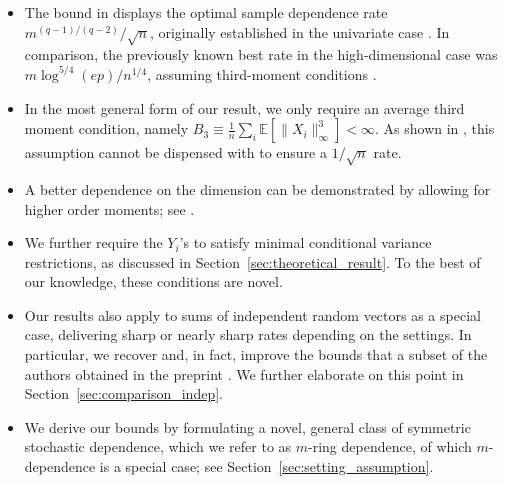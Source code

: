 \documentclass[aos]{imsart}
\begin{document}
\begin{itemize}
    \item The bound in  displays the optimal sample dependence rate $m^{(q-1)/(q-2)}/\sqrt{n}$,
    originally established in the univariate case \citep{shergin1980convergence,chen2004normal}. 
    In comparison, the previously known best rate in the high-dimensional case was $m\log^{5/4}(ep)/n^{1/4}$, assuming third-moment conditions \citep[Theorem 1.4]{fang2021high}.
    \item In the most general form of our result, we only require an average third moment condition, namely $ B _3 \equiv \frac{1}{n} \sum_i \mathbb{E}[\| X_i\|^3_\infty] < \infty$. As shown in , this assumption cannot be dispensed with to ensure a $1/\sqrt{n}$ rate. 
    \item A better dependence on the dimension can be demonstrated by allowing for higher order moments; see .
    \item We further require the $Y_i$'s to satisfy minimal conditional variance restrictions, as discussed in Section~\ref{sec:theoretical_result}. To the best of our knowledge, these conditions are novel.
     \item Our results also apply to sums of independent random vectors as a special case, delivering sharp or nearly sharp rates depending on the settings. In particular, we recover and, in fact, improve the bounds that a subset of the authors obtained in the preprint . We further elaborate on this point in Section~\ref{sec:comparison_indep}.
    \item We derive our bounds by formulating a novel, general class of symmetric stochastic dependence, which we refer to as $m$-ring dependence, of which $m$-dependence is a special case; see Section~\ref{sec:setting_assumption}.
\end{itemize}
 
\end{document}
